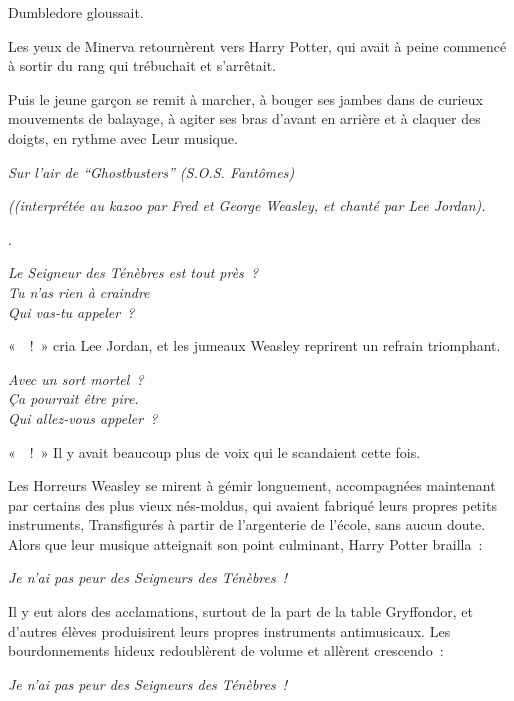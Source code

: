 Dumbledore gloussait.

Les yeux de Minerva retournèrent vers Harry Potter, qui avait à peine commencé à sortir du rang qui trébuchait et s'arrêtait.

Puis le jeune garçon se remit à marcher, à bouger ses jambes dans de curieux mouvements de balayage, à agiter ses bras d'avant en arrière et à claquer des doigts, en rythme avec Leur musique.

\begin{center}
\emph{Sur l'air de “Ghostbusters” (S.O.S. Fantômes)}

\emph{((interprétée au kazoo par Fred et George Weasley,
et chanté par Lee Jordan).}

.

\emph{Le Seigneur des Ténèbres est tout près~?\\
Tu n'as rien à craindre\\
Qui vas-tu appeler~?}
\end{center}

«~~!~» cria Lee Jordan, et les jumeaux Weasley reprirent un refrain triomphant.

\begin{center}
\emph{Avec un sort mortel~?\\
Ça pourrait être pire.\\
Qui allez-vous appeler~?}
\end{center}

«~~!~» Il y avait beaucoup plus de voix qui le scandaient cette fois.

Les Horreurs Weasley se mirent à gémir longuement, accompagnées maintenant par certains des plus vieux nés-moldus, qui avaient fabriqué leurs propres petits instruments, Transfigurés à partir de l'argenterie de l'école, sans aucun doute. Alors que leur musique atteignait son point culminant, Harry Potter brailla~:

\begin{center}
\emph{Je n'ai pas peur des Seigneurs des Ténèbres~!}\footnotemark
\end{center}

Il y eut alors des acclamations, surtout de la part de la table Gryffondor, et d'autres élèves produisirent leurs propres instruments antimusicaux. Les bourdonnements hideux redoublèrent de volume et allèrent crescendo~:

\begin{center}
\emph{Je n'ai pas peur des Seigneurs des Ténèbres~!}
\end{center}

